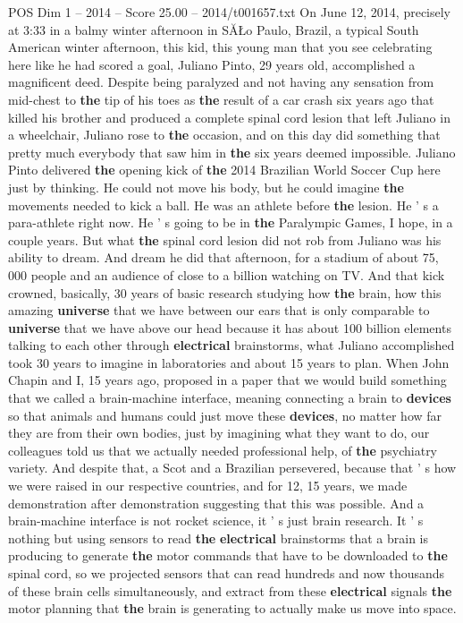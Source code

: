 \begin{textsample}{POS Dim 1 – 2014 – Score 25.00 – 2014/t001657.txt}  \label{ex:f1_pos_045}
On June 12, 2014, precisely at 3:33 in a balmy winter afternoon in SĂŁo Paulo, Brazil, a typical South American winter afternoon, this kid, this young man that you see celebrating here like he had scored a goal, Juliano Pinto, 29 years old, accomplished a magnificent deed.
Despite being paralyzed and not having any sensation from mid-chest to \textbf{the} tip of his toes as \textbf{the} result of a car crash six years ago that killed his brother and produced a complete spinal cord lesion that left Juliano in a wheelchair, Juliano rose to \textbf{the} occasion, and on this day did something that pretty much everybody that saw him in \textbf{the} six years deemed impossible.
Juliano Pinto delivered \textbf{the} opening kick of \textbf{the} 2014 Brazilian World Soccer Cup here just by thinking.
He could not move his body, but he could imagine \textbf{the} movements needed to kick a ball.
He was an athlete before \textbf{the} lesion.
He ' s a para-athlete right now.
He ' s going to be in \textbf{the} Paralympic Games, I hope, in a couple years.
But what \textbf{the} spinal cord lesion did not rob from Juliano was his ability to dream.
And dream he did that afternoon, for a stadium of about 75, 000 people and an audience of close to a billion watching on TV.
And that kick crowned, basically, 30 years of basic research studying how \textbf{the} brain, how this amazing \textbf{universe} that we have between our ears that is only comparable to \textbf{universe} that we have above our head because it has about 100 billion elements talking to each other through \textbf{electrical} brainstorms, what Juliano accomplished took 30 years to imagine in laboratories and about 15 years to plan.
When John Chapin and I, 15 years ago, proposed in a paper that we would build something that we called a brain-machine interface, meaning connecting a brain to \textbf{devices} so that animals and humans could just move these \textbf{devices}, no matter how far they are from their own bodies, just by imagining what they want to do, our colleagues told us that we actually needed professional help, of \textbf{the} psychiatry variety.
And despite that, a Scot and a Brazilian persevered, because that ' s how we were raised in our respective countries, and for 12, 15 years, we made demonstration after demonstration suggesting that this was possible.
And a brain-machine interface is not rocket science, it ' s just brain research.
It ' s nothing but using sensors to read \textbf{the} \textbf{electrical} brainstorms that a brain is producing to generate \textbf{the} motor commands that have to be downloaded to \textbf{the} spinal cord, so we projected sensors that can read hundreds and now thousands of these brain cells simultaneously, and extract from these \textbf{electrical} signals \textbf{the} motor planning that \textbf{the} brain is generating to actually make us move into space.

\end{textsample}
